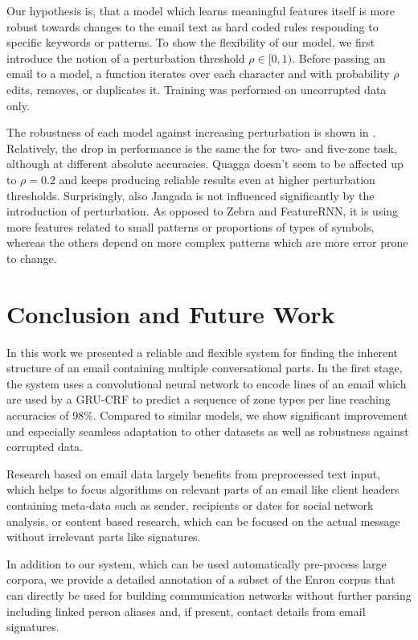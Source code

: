 \documentclass{llncs}
\begin{document}
Our hypothesis is, that a model which learns meaningful features itself is more robust towards changes to the email text as hard coded rules responding to specific keywords or patterns.
To show the flexibility of our model, we first introduce the notion of a perturbation threshold $\rho\in[0,1)$.
Before passing an email to a model, a function iterates over each character and with probability $\rho$ edits, removes, or duplicates it.
Training was performed on uncorrupted data only.

The robustness of each model against increasing perturbation is shown in .
Relatively, the drop in performance is the same the for two- and five-zone task, although at different absolute accuracies.
Quagga doesn't seem to be affected up to $\rho=0.2$ and keeps producing reliable results even at higher perturbation thresholds.
Surprisingly, also Jangada is not influenced significantly by the introduction of perturbation.
As opposed to Zebra and FeatureRNN, it is using more features related to small patterns or proportions of types of symbols, whereas the others depend on more complex patterns which are more error prone to change.

\section{Conclusion and Future Work}
In this work we presented a reliable and flexible system for finding the inherent structure of an email containing multiple conversational parts.
In the first stage, the system uses a convolutional neural network to encode lines of an email which are used by a GRU-CRF to predict a sequence of zone types per line reaching accuracies of 98\%.
Compared to similar models, we show significant improvement and especially seamless adaptation to other datasets as well as robustness against corrupted data.

Research based on email data largely benefits from preprocessed text input, which helps to focus algorithms on relevant parts of an email like client headers containing meta-data such as sender, recipients or dates for social network analysis, or content based research, which can be focused on the actual message without irrelevant parts like signatures.

In addition to our system, which can be used automatically pre-process large corpora, we provide a detailed annotation of a subset of the Enron corpus that can directly be used for building communication networks without further parsing including linked person aliases and, if present, contact details from email signatures.
\end{document}
